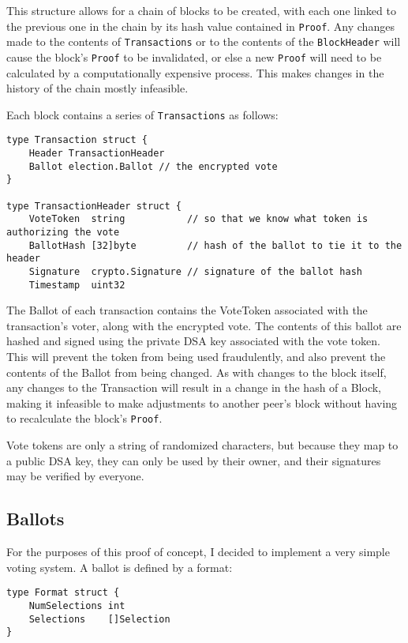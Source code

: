 \documentclass[a4paper,12pt]{article}
\begin{document}
This structure allows for a chain of blocks to be created, with each one linked to the previous one in the chain by its hash value contained in \verb|Proof|. Any changes made to the contents of \verb|Transactions| or to the contents of the \verb|BlockHeader| will cause the block's \verb|Proof| to be invalidated, or else a new \verb|Proof| will need to be calculated by a computationally expensive process. This makes changes in the history of the chain mostly infeasible.

Each block contains a series of \verb|Transactions| as follows:
\begin{Verbatim}[obeytabs,tabsize=4]
type Transaction struct {
	Header TransactionHeader
	Ballot election.Ballot // the encrypted vote
}

type TransactionHeader struct {
	VoteToken  string           // so that we know what token is authorizing the vote
	BallotHash [32]byte         // hash of the ballot to tie it to the header
	Signature  crypto.Signature // signature of the ballot hash
	Timestamp  uint32
\end{Verbatim}

The Ballot of each transaction contains the VoteToken associated with the transaction's voter, along with the encrypted vote. The contents of this ballot are hashed and signed using the private DSA key associated with the vote token. This will prevent the token from being used fraudulently, and also prevent the contents of the Ballot from being changed. As with changes to the block itself, any changes to the Transaction will result in a change in the hash of a Block, making it infeasible to make adjustments to another peer's block without having to recalculate the block's \verb|Proof|.

Vote tokens are only a string of randomized characters, but because they map to a public DSA key, they can only be used by their owner, and their signatures may be verified by everyone.

\subsection{Ballots}
For the purposes of this proof of concept, I decided to implement a very simple voting system. A ballot is defined by a format:

\begin{Verbatim}[obeytabs,tabsize=4]
type Format struct {
	NumSelections int
	Selections    []Selection
}
\end{Verbatim}
\end{document}

